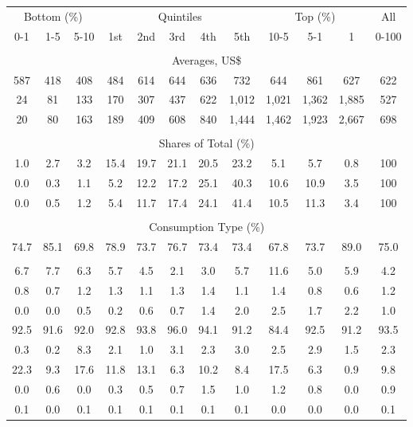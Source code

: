 \begin{tabular}{c c c| c c c c c| c c c| c}
\toprule
\multicolumn{3}{c|}{Bottom (\%)} & \multicolumn{5}{c|}{Quintiles} & \multicolumn{3}{c|}{Top (\%)} & All  \\
0-1 & 1-5 & 5-10 &  1st & 2nd & 3rd & 4th & 5th & 10-5 & 5-1 & 1 & 0-100 \\
\midrule \\
\multicolumn{12}{c}{Averages, US\$} \\
\midrule
587  & 418  & 408  & 484  & 614  & 644  & 636  & 732  & 644  & 861  & 627  & 622 \\
24 & 81 & 133 & 170 & 307 & 437 & 622 & 1,012 & 1,021 & 1,362 & 1,885 & 527 \\
20 & 80 & 163 & 189 & 409 & 608 & 840 & 1,444 & 1,462 & 1,923 & 2,667 & 698 \\
\midrule \\
\multicolumn{12}{c}{Shares of Total (\%)} \\
\midrule
1.0   & 2.7   & 3.2   & 15.4   & 19.7   & 21.1   & 20.5   & 23.2   & 5.1   & 5.7   & 0.8   & 100 \\
0.0  & 0.3  & 1.1  & 5.2  & 12.2  & 17.2  & 25.1  & 40.3  & 10.6  & 10.9  & 3.5  & 100 \\
0.0  & 0.5  & 1.2  & 5.4  & 11.7  & 17.4  & 24.1  & 41.4  & 10.5  & 11.3  & 3.4  & 100 \\
\midrule \\
\multicolumn{12}{c}{Consumption Type (\%)}  \\
\midrule
74.7 & 85.1 & 69.8 & 78.9 & 73.7 & 76.7 & 73.4 & 73.4 & 67.8 & 73.7 & 89.0 & 75.0 \\
 & & & & & & & & & & &  \\
6.7 & 7.7 & 6.3 & 5.7 & 4.5 & 2.1 & 3.0 & 5.7 & 11.6 & 5.0 & 5.9 & 4.2 \\
0.8 & 0.7 & 1.2 & 1.3 & 1.1 & 1.3 & 1.4 & 1.1 & 1.4 & 0.8 & 0.6 & 1.2 \\
0.0 & 0.0 & 0.5 & 0.2 & 0.6 & 0.7 & 1.4 & 2.0 & 2.5 & 1.7 & 2.2 & 1.0 \\
92.5 & 91.6 & 92.0 & 92.8 & 93.8 & 96.0 & 94.1 & 91.2 & 84.4 & 92.5 & 91.2 & 93.5 \\
0.3 & 0.2 & 8.3 & 2.1 & 1.0 & 3.1 & 2.3 & 3.0 & 2.5 & 2.9 & 1.5 & 2.3 \\
22.3 & 9.3 & 17.6 & 11.8 & 13.1 & 6.3 & 10.2 & 8.4 & 17.5 & 6.3 & 0.9 & 9.8 \\
0.0 & 0.6 & 0.0 & 0.3 & 0.5 & 0.7 & 1.5 & 1.0 & 1.2 & 0.8 & 0.0 & 0.9 \\
0.1 & 0.0 & 0.1 & 0.1 & 0.1 & 0.1 & 0.1 & 0.1 & 0.0 & 0.0 & 0.0 & 0.1 \\

\end{tabular}
